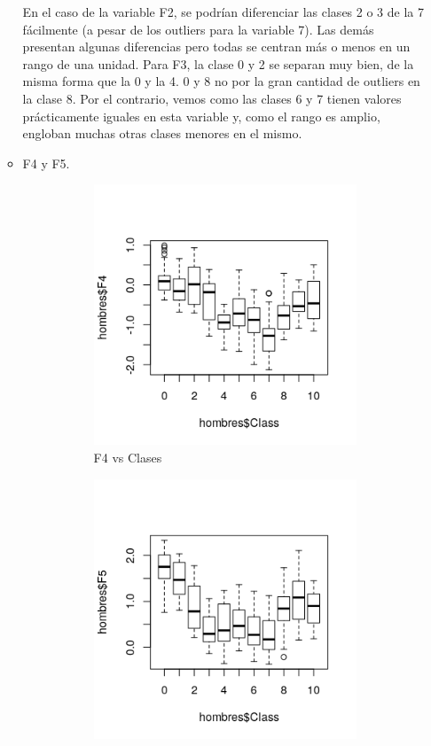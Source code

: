 \begin{itemize}
\begin{itemize}
	En el caso de la variable F2, se podrían diferenciar las clases 2 o 3 de la 7 fácilmente (a pesar de los outliers para la variable 7). Las demás presentan algunas diferencias pero todas se centran más o menos en un rango de una unidad. Para F3, la clase 0 y 2 se separan muy bien, de la misma forma que la 0 y la 4. 0 y 8 no por la gran cantidad de outliers en la clase 8. Por el contrario, vemos como las clases 6 y 7 tienen valores prácticamente iguales en esta variable y, como el rango es amplio, engloban muchas otras clases menores en el mismo.
	
		\item F4 y F5.
	
	\begin{figure}[H]
		\centering
		\begin{subfigure}{.5\textwidth}
			\centering
			\includegraphics[width=.8\linewidth]{bphF4.png}
			\caption{F4 vs Clases}
			\label{fig:bphF4}
		\end{subfigure}%
		\begin{subfigure}{.5\textwidth}
			\centering
			\includegraphics[width=.8\linewidth]{bphF5.png}

\end{subfigure}
\end{figure}
\end{itemize}
\end{itemize}
